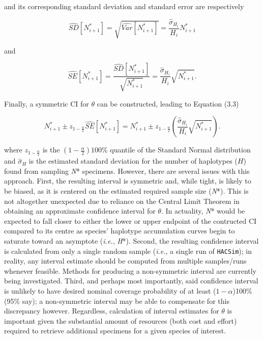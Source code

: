 \noindent and its corresponding standard deviation and standard error are respectively

\begin{equation}
\widehat{SD}[N^*_{i+1}] = \sqrt{\widehat{Var}[N^*_{i+1}]} = \frac{\hat{\sigma}_{H_i}}{H_i}N^*_{i+1}
\end{equation}

\noindent and

\begin{equation}
\widehat{SE}[N^*_{i+1}] = \frac{\widehat{SD}[N^*_{i+1}]}{\sqrt{N^*_{i+1}}} = \frac{\hat{\sigma}_{H_i}}{H_i}\sqrt{N^*_{i+1}}.
\end{equation}

\vspace{5mm}

Finally, a symmetric CI for $\theta$ can be constructed, leading to Equation (3.3)

\begin{equation}
N^*_{i+1} \pm z_{1-\frac{\alpha}{2}}\widehat{SE}[N^*_{i+1}] = N^*_{i+1} \pm z_{1-\frac{\alpha}{2}}\left(\frac{\hat{\sigma}_{H_i}}{H_i}\sqrt{N^*_{i+1}}\right).
\end{equation}

\noindent where $z_{1-\frac{\alpha}{2}}$ is the $(1-\frac{\alpha}{2})100\%$ quantile of the Standard Normal distribution and $\hat{\sigma}_{H}$ is the estimated standard deviation for the number of haplotypes ($H$) found from sampling \textit{N}* specimens.  However, there are several issues with this approach. First, the resulting interval is symmetric and, while tight, is likely to be biased, as it is centered on the estimated required sample size (\textit{N}*). This is not altogether unexpected due to reliance on the Central Limit Theorem in obtaining an approximate confidence interval for $\theta$. In actuality, \textit{N}* would be expected to fall closer to either the lower or upper endpoint of the contructed CI compared to its centre as species' haplotype accumulation curves begin to saturate toward an asymptote (\textit{i.e.}, \textit{H}*). Second, the resulting confidence interval is calculated from only a single random sample (\textit{i.e.}, a single run of {\tt HACSim}); in reality, any interval estimate should be computed from multiple samples/runs whenever feasible. Methods for producing a non-symmetric interval are currently being investigated. Third, and perhaps most importantly, said confidence interval is unlikely to have desired nominal coverage probability of at least 
($1 - \alpha$)100\% (95\% say); a non-symmetric interval may be able to compensate for this discrepancy however. Regardless, calculation of interval estimates for $\theta$ is important given the substantial amount of resources (both cost and effort) required to retrieve additional specimens for a given species of interest.

